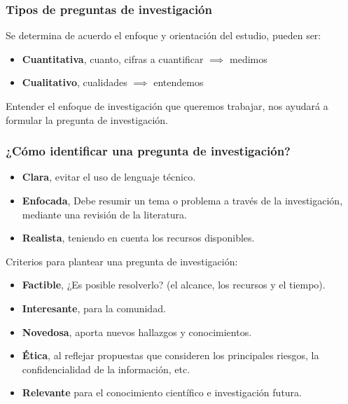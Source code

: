 \documentclass[
	11pt, %
]{beamer}
\begin{document}
\begin{frame}
  \frametitle{Tipos de preguntas de investigación}
  \bigskip %
  Se determina de acuerdo el enfoque y orientación del estudio, pueden ser:

  \begin{itemize}
  \item \textbf{Cuantitativa}, cuanto, cifras a cuantificar $\implies$ medimos
  \item \textbf{Cualitativo}, cualidades $\implies$ entendemos 
  \end{itemize}

  Entender el enfoque de investigación que queremos trabajar, nos ayudará a formular la pregunta de investigación.
  
\end{frame}

\begin{frame}
  \frametitle{¿Cómo identificar una pregunta de investigación?}
  \begin{itemize}
  \item \textbf{Clara}, evitar el uso de lenguaje técnico.
  \item \textbf{Enfocada}, Debe resumir un tema o problema a través de la investigación, mediante una revisión de la literatura.
  \item \textbf{Realista}, teniendo en cuenta los recursos disponibles.
  \end{itemize}
  
\end{frame}

\begin{frame}
  Criterios para plantear una pregunta de investigación:\\
  \bigskip %
  \begin{itemize}
  \item \textbf{Factible}, ¿Es posible resolverlo? (el alcance, los recursos y el tiempo).
  \item \textbf{Interesante}, para la comunidad.
  \item \textbf{Novedosa}, aporta nuevos hallazgos y conocimientos.
  \item \textbf{Ética}, al reflejar propuestas que consideren los principales riesgos, la confidencialidad de la información, etc.
  \item \textbf{Relevante} para el conocimiento científico e investigación futura.
  \end{itemize}

\end{frame}
\end{document}
